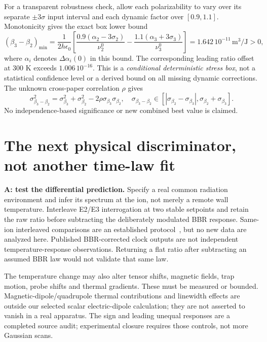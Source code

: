 \documentclass[11pt,a4paper]{article}
\begin{document}
For a transparent robustness check, allow each polarizability to vary
over its separate $\pm3\sigma$ input interval and each dynamic factor
over $[0.9,1.1]$. Monotonicity gives the exact box lower bound
\begin{equation}
 (\beta_3-\beta_2)_{\min}
 =\frac{1}{2h\epsilon_0}
 \left[\frac{0.9(\alpha_2-3\sigma_2)}{\nu_2^0}
       -\frac{1.1(\alpha_3+3\sigma_3)}{\nu_3^0}\right]
 =1.642\,10^{-11}\,\mathrm{m^3/J}>0,
\end{equation}
where $\alpha_i$ denotes $\Delta\alpha_i(0)$ in this bound.
The corresponding leading ratio offset at 300 K exceeds
$1.006\,10^{-16}$. This is a \emph{conditional deterministic stress box},
not a statistical confidence level or a derived bound on all missing
dynamic corrections. The unknown cross-paper correlation $\rho$ gives
\begin{equation}
 \sigma_{\beta_3-\beta_2}^2=\sigma_{\beta_3}^2+\sigma_{\beta_2}^2
              -2\rho\sigma_{\beta_3}\sigma_{\beta_2},\quad
 \sigma_{\beta_3-\beta_2}\in
 [|\sigma_{\beta_2}-\sigma_{\beta_3}|,\sigma_{\beta_2}+\sigma_{\beta_3}].
\end{equation}
No independence-based significance or new combined best value is claimed.

\newpage
\section{The next physical discriminator, not another time-law fit}
\textbf{A: test the differential prediction.} Specify a real common
radiation environment and infer its spectrum at the ion, not merely
a remote wall temperature. Interleave E2/E3 interrogation at two
stable setpoints and retain the raw ratio before subtracting the
deliberately modulated BBR response. Same-ion interleaved comparisons
are an established protocol~\cite{filzinger}, but no new data are
analyzed here. Published BBR-corrected clock outputs are not independent
temperature-response observations. Returning a flat ratio after
subtracting an assumed BBR law would not validate that same law.

The temperature change may also alter tensor shifts, magnetic fields,
trap motion, probe shifts and thermal gradients. These must be measured
or bounded. Magnetic-dipole/quadrupole thermal contributions and
linewidth effects are outside our selected scalar electric-dipole
calculation; they are not asserted to vanish in a real apparatus.
The sign and leading unequal responses are a completed source audit;
experimental closure requires those controls, not more Gaussian scans.
\end{document}
